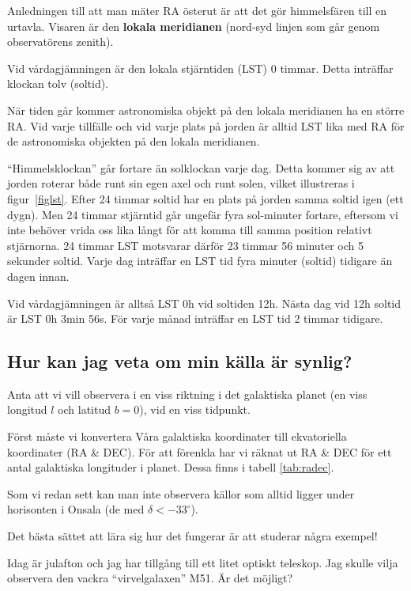 Anledningen till att man mäter RA österut är att det gör himmelsfären
till en urtavla. Visaren är den \textbf{lokala meridianen} (nord-syd
linjen som går genom observatörens zenith).


Vid vårdagjämningen är den lokala stjärntiden (LST) 0 timmar. Detta
inträffar klockan tolv (soltid).

När tiden går kommer astronomiska objekt på den lokala meridianen ha
en större RA. Vid varje tillfälle och vid varje plats på jorden är
alltid LST lika med RA för de astronomiska objekten på den lokala meridianen.

``Himmelsklockan'' går fortare än solklockan varje dag. Detta kommer
sig av att jorden roterar både runt sin egen axel och runt solen,
vilket illustreras i figur~\ref{figlst}. Efter 24 timmar soltid har en
plats på jorden samma soltid igen (ett dygn). Men 24 timmar stjärntid
går ungefär fyra sol-minuter fortare, eftersom vi inte behöver vrida
oss lika långt för att komma till samma position relativt
stjärnorna. 24 timmar LST motsvarar därför 23 timmar 56 minuter och 5
sekunder soltid. Varje dag inträffar en LST tid fyra minuter (soltid)
tidigare än dagen innan.

Vid vårdagjämningen är alltså LST 0h vid soltiden 12h. Nästa dag vid
12h soltid är LST 0h 3min 56s. För varje månad inträffar en LST tid 2
timmar tidigare.

\subsection{Hur kan jag veta om min källa är synlig?}
\label{app:visiblecoords}

Anta att vi vill observera i en viss riktning i det galaktiska planet
(en viss longitud $l$ och latitud $b=0$), vid en viss tidpunkt.

Först måste vi konvertera Våra galaktiska koordinater till
ekvatoriella koordinater (RA \& DEC). För att förenkla har vi räknat
ut RA \& DEC för ett antal galaktiska longituder i planet. Dessa finns i tabell \ref{tab:radec}. 

Som vi redan sett kan man inte observera källor som alltid ligger under
horisonten i Onsala (de med $\delta < -33^\circ$).

Det bästa sättet att lära sig hur det fungerar är att studerar några exempel!

 Idag är julafton och jag har tillgång till
ett litet optiskt teleskop. Jag skulle vilja observera den vackra
``virvelgalaxen'' M51. Är det möjligt? 

